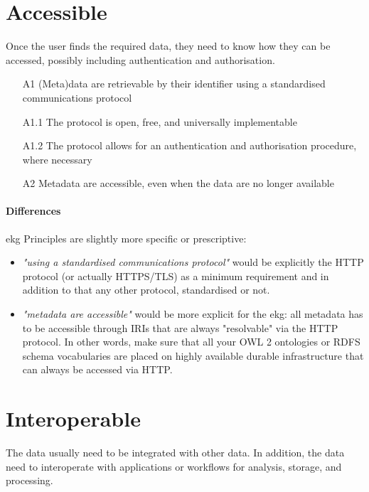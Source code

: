 \section{Accessible}

Once the user finds the required data, they need to know how they can be accessed,
possibly including authentication and authorisation.

\begin{itemize}
    \item[A1] (Meta)data are retrievable by their identifier using a standardised communications protocol
    \item[A1.1] The protocol is open, free, and universally implementable
    \item[A1.2] The protocol allows for an authentication and authorisation procedure, where necessary
    \item[A2] Metadata are accessible, even when the data are no longer available
\end{itemize}

\paragraph{Differences}

\gls{ekg} Principles are slightly more specific or prescriptive:

\begin{itemize}
    \item \textit{"using a standardised communications protocol"} would be explicitly the HTTP protocol
          (or actually HTTPS/TLS) as a minimum requirement and in addition to that any other protocol,
          standardised or not.
    \item \textit{"metadata are accessible"} would be more explicit for the \gls{ekg}:
          all metadata has to be accessible through IRIs that are always "resolvable" via the HTTP protocol.
          In other words, make sure that all your OWL 2 ontologies or RDFS schema vocabularies are placed on
          highly available durable infrastructure that can always be accessed via HTTP.
\end{itemize}

\section{Interoperable}

The data usually need to be integrated with other data.
In addition, the data need to interoperate with applications or workflows for analysis, storage, and processing.

